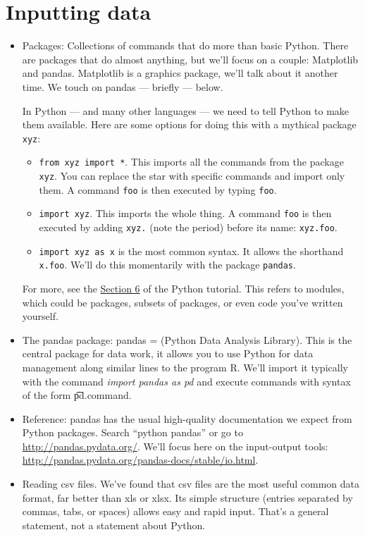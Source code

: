 \documentclass[11pt]{article}
\begin{document}
\section{Inputting data}
\begin{itemize}
\item Packages:  Collections of commands that do more than basic Python.
There are packages that do almost anything, but we'll focus on a couple:
Matplotlib and pandas.  Matplotlib is a graphics package, we'll talk about it
another time.
We touch on pandas --- briefly --- below.

In Python --- and many other languages --- we need to tell Python to make them available.
Here are some options for doing this with a mythical package {\tt xyz}:
\begin{itemize}
\item {\tt from xyz import *}.
This imports all the commands from the package {\tt xyz}.
You can replace the star
with specific commands and import only them.
A command {\tt foo} is then executed by typing {\tt foo}.
\item {\tt import xyz}.  This imports the whole thing.
A command {\tt foo} is then executed by adding {\tt xyz.}
(note the period) before its name:  {\tt xyz.foo}.
\item {\tt import xyz as x} is the most common syntax.
It allows the shorthand {\tt x.foo}.
We'll do this momentarily with the package {\tt pandas}.
\end{itemize}
For more, see the
\href{https://docs.python.org/3.4/tutorial/modules.html}{Section 6}
of the Python tutorial.
This refers to modules, which could be packages, subsets of packages, or even
code you've written yourself.

\item The pandas package:  pandas = (Python Data Analysis Library).
This is the central package for data work,
it allows you to use Python for data management along similar
lines to the program R.
We'll import it typically with the command {\it import pandas as pd}
and execute commands with syntax of the form {\t pd.command}.

\item Reference:  pandas has the usual high-quality
{documentation}
we expect from Python packages.
Search ``python pandas'' or go to
\url{http://pandas.pydata.org/}.
We'll focus here on the input-output tools:
\url{http://pandas.pydata.org/pandas-docs/stable/io.html}.

\item Reading csv files.  We've found that csv files
are the most useful common data format, far better than xls or xlsx.
Its simple structure (entries separated by commas, tabs, or spaces) allows easy and rapid input.
That's a general statement, not a statement about Python.


\end{itemize}
\end{document}
